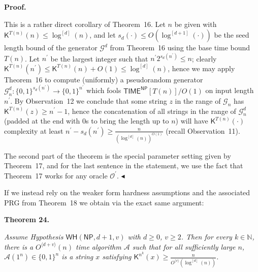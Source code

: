 \documentclass[10pt,a4paper]{article}
\begin{document}



\par\medskip\noindent\textbf{Proof.}\par




This is a rather direct corollary of Theorem 16. Let $n$ be given with ${\mathsf{K}}^{T(n)}(n)\leq\log^{[d]}(n)$, and let $s_{d}(\cdot)\leq O(\log^{[d+1]}(\cdot))$ be the seed length bound of the generator $\mathcal{G}^{d}$ from Theorem 16 using the base time bound $T(n)$. Let $n^{\prime}$ be the largest integer such that $n^{\prime}2^{s_{d}(n^{\prime})}\leq n$; clearly ${\mathsf{K}}^{T(n)}(n^{\prime})\leq{\mathsf{K}}^{T(n)}(n)+O(1)\leq\log^{[d]}(n)$, hence we may apply Theorem 16 to compute (uniformly) a pseudorandom generator $\mathcal{G}^{d}_{n}:\{0,1\}^{s_{d}(n^{\prime})}\to\{0,1\}^{n^{\prime}}$ which fools ${\mathsf{TIME}}^{{\mathsf{NP}}}[T(n)]/O(1)$ on input length $n^{\prime}$. By Observation 12 we conclude that some string $z$ in the range of $\mathcal{G}_{n}$ has ${\mathsf{K}}^{T(n)}(z)\geq n^{\prime}-1$, hence the concatenation of all strings in the range of $\mathcal{G}^{d}_{n}$ (padded at the end with $0$s to bring the length up to $n$) will have ${\mathsf{K}}^{T(n)}(\cdot)$ complexity at least $n^{\prime}-s_{d}(n^{\prime})\geq\frac{n}{(\log^{[d]}(n))^{O(1)}}$ (recall Observation 11).\par




The second part of the theorem is the special parameter setting given by Theorem 17, and for the last sentence in the statement, we use the fact that Theorem 17 works for any oracle $\mathcal{O^{\prime}}$.
$\blacktriangleleft$\par




If we instead rely on the weaker form hardness assumptions and the associated PRG from Theorem 18 we obtain via the exact same argument:\par





\par\medskip\noindent\textbf{
\textbf{Theorem 24}\textbf{.}
}\par



\emph{Assume Hypothesis $\mathsf{WH}({\mathsf{NP}},d+1,v)$ with $d\geq 0$, $v\geq 2$. Then for every $k\in\mathbb{N}$, there is a $O^{\langle d+v\rangle}(n)$ time algorithm $\mathcal{A}$ such that for all sufficiently large $n$, $\mathcal{A}(1^{n})\in\{0,1\}^{n}$ is a string $x$ satisfying ${\mathsf{K}}^{n^{k}}(x)\geq\frac{n}{O^{\langle v\rangle}(\log^{[d]}(n))}$.}\par
\end{document}
